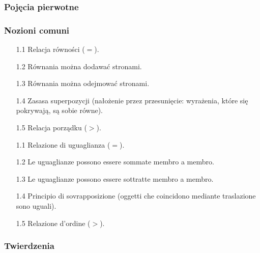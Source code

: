 \subsubsection{Pojęcia pierwotne} %
\subsubsection{Nozioni comuni} %
\begin{enumerate}
    \item [1.1] Relacja równości ($=$). %
    \item [1.2] Równania można dodawać stronami. %
    \item [1.3] Równania można odejmować stronami. %
    \item [1.4] Zasasa superpozycji (nałożenie przez przesunięcie: wyrażenia, które się pokrywają, są sobie równe). %
    \item [1.5] Relacja porządku ($>$). %
    \item [1.1] Relazione di uguaglianza ($=$). %
    \item [1.2] Le uguaglianze possono essere sommate membro a membro. %
    \item [1.3] Le uguaglianze possono essere sottratte membro a membro. %
    \item [1.4] Principio di sovrapposizione (oggetti che coincidono mediante traslazione sono uguali). %
    \item [1.5] Relazione d'ordine ($>$). %
\end{enumerate}

\subsubsection{Twierdzenia} %
